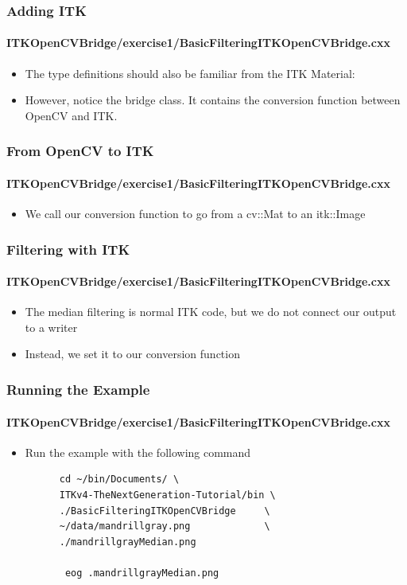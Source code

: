\begin{frame}
\frametitle{Adding ITK}
\framesubtitle{ITKOpenCVBridge/exercise1/BasicFilteringITKOpenCVBridge.cxx}
\begin{itemize}
\item The type definitions should also be familiar from the ITK
  Material:
\item However, notice the bridge class. It contains the conversion function
between OpenCV and ITK.
\end{itemize}
\end{frame}

\begin{frame}
\frametitle{From OpenCV to ITK}
\framesubtitle{ITKOpenCVBridge/exercise1/BasicFilteringITKOpenCVBridge.cxx}
\begin{itemize}
\item We call our conversion function to go from a cv::Mat to an
  itk::Image
\end{itemize}
\end{frame}

\begin{frame}
\frametitle{Filtering with ITK}
\framesubtitle{ITKOpenCVBridge/exercise1/BasicFilteringITKOpenCVBridge.cxx}
\begin{itemize}
\item The median filtering is normal ITK code, but we do not connect our
output to a writer
\pause
\item Instead, we set it to our conversion function
\end{itemize}
\end{frame}

\begin{frame}[fragile]
\frametitle{Running the Example}
\framesubtitle{ITKOpenCVBridge/exercise1/BasicFilteringITKOpenCVBridge.cxx}
\begin{itemize}
\item Run the example with the following command
\begin{verbatim}
      cd ~/bin/Documents/ \
      ITKv4-TheNextGeneration-Tutorial/bin \
      ./BasicFilteringITKOpenCVBridge     \
      ~/data/mandrillgray.png             \
      ./mandrillgrayMedian.png            

       eog .mandrillgrayMedian.png
\end{verbatim}
\end{itemize}
\end{frame}

